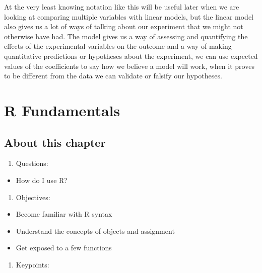 \documentclass[
]{book}
\providecommand{\tightlist}{%
  \setlength{\itemsep}{0pt}\setlength{\parskip}{0pt}}
\begin{document}
At the very least knowing notation like this will be useful later when we are looking at comparing multiple variables with linear models, but the linear model also gives us a lot of ways of talking about our experiment that we might not otherwise have had. The model gives us a way of assessing and quantifying the effects of the experimental variables on the outcome and a way of making quantitative predictions or hypotheses about the experiment, we can use expected values of the coefficients to say how we believe a model will work, when it proves to be different from the data we can validate or falsify our hypotheses.

\hypertarget{r-fundamentals}{%
\chapter{R Fundamentals}\label{r-fundamentals}}

\hypertarget{about-this-chapter}{%
\section{About this chapter}\label{about-this-chapter}}

\begin{enumerate}
\def\labelenumi{\arabic{enumi}.}
\tightlist
\item
  Questions:
\end{enumerate}

\begin{itemize}
\tightlist
\item
  How do I use R?
\end{itemize}

\begin{enumerate}
\def\labelenumi{\arabic{enumi}.}
\setcounter{enumi}{1}
\tightlist
\item
  Objectives:
\end{enumerate}

\begin{itemize}
\tightlist
\item
  Become familiar with R syntax
\item
  Understand the concepts of objects and assignment
\item
  Get exposed to a few functions
\end{itemize}

\begin{enumerate}
\def\labelenumi{\arabic{enumi}.}
\setcounter{enumi}{2}
\tightlist
\item
  Keypoints:
\end{enumerate}
\end{document}
